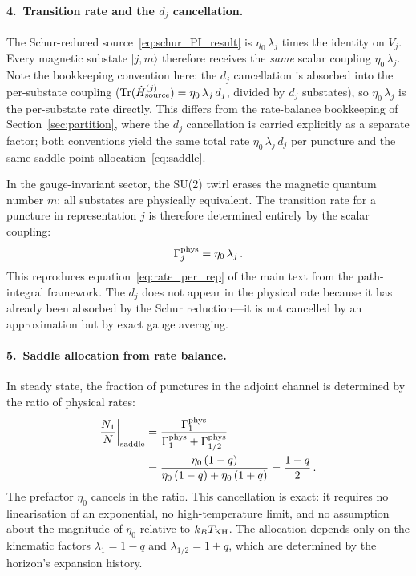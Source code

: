 \documentclass[aps,prd,twocolumn,10pt,superscriptaddress,nofootinbib]{revtex4-2}
\begin{document}
\paragraph{4.\ Transition rate and the $d_j$ cancellation.}

The Schur-reduced source~\eqref{eq:schur_PI_result} is
$\eta_0\,\lambda_j$ times the identity on $V_j$.  Every magnetic
substate $|j,m\rangle$ therefore receives the \emph{same} scalar
coupling $\eta_0\,\lambda_j$.  Note the bookkeeping convention
here: the $d_j$ cancellation is absorbed into the per-substate
coupling ($\mathrm{Tr}(\hat{H}^{(j)}_{\rm source}) =
\eta_0\,\lambda_j\,d_j$, divided by $d_j$ substates), so
$\eta_0\,\lambda_j$ is the per-substate rate directly.  This
differs from the rate-balance bookkeeping
of Section~\ref{sec:partition}, where the $d_j$ cancellation
is carried explicitly as a separate factor; both conventions
yield the same total rate $\eta_0\,\lambda_j\,d_j$ per puncture
and the same saddle-point allocation~\eqref{eq:saddle}.

In the gauge-invariant sector, the SU(2) twirl erases the
magnetic quantum number $m$: all substates are physically
equivalent.  The transition rate for a puncture in representation
$j$ is therefore determined entirely by the scalar coupling:
\begin{equation}
\Gamma_j^{\rm phys} = \eta_0\,\lambda_j\,.
\label{eq:rate_physical}
\end{equation}
This reproduces equation~\eqref{eq:rate_per_rep} of the main text
from the path-integral framework.  The $d_j$ does not appear in
the physical rate because it has already been absorbed by the
Schur reduction---it is not cancelled by an approximation but by
exact gauge averaging.

\paragraph{5.\ Saddle allocation from rate balance.}

In steady state, the fraction of punctures in the adjoint channel
is determined by the ratio of physical rates:
\begin{align}
\frac{N_1}{N}\bigg|_{\rm saddle}
  &= \frac{\Gamma_1^{\rm phys}}
         {\Gamma_1^{\rm phys} + \Gamma_{1/2}^{\rm phys}}
\nonumber \\
  &= \frac{\eta_0\,(1-q)}
         {\eta_0\,(1-q) + \eta_0\,(1+q)}
  = \frac{1-q}{2}\,.
\label{eq:saddle_PI}
\end{align}
The prefactor $\eta_0$ cancels in the ratio.  This cancellation is
exact: it requires no linearisation of an exponential, no
high-temperature limit, and no assumption about the magnitude of
$\eta_0$ relative to $k_B T_{\rm KH}$.  The allocation depends only on
the kinematic factors $\lambda_1 = 1-q$ and
$\lambda_{1/2} = 1+q$, which are determined by the horizon's
expansion history.
\end{document}
